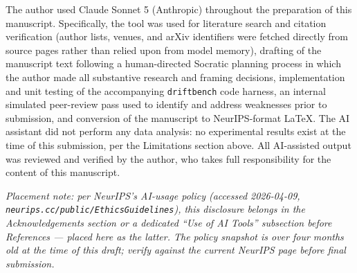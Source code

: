 \documentclass{article}
\begin{document}
The author used Claude Sonnet 5 (Anthropic) throughout the preparation of this manuscript. Specifically, the tool was used for literature search and citation verification (author lists, venues, and arXiv identifiers were fetched directly from source pages rather than relied upon from model memory), drafting of the manuscript text following a human-directed Socratic planning process in which the author made all substantive research and framing decisions, implementation and unit testing of the accompanying \texttt{driftbench} code harness, an internal simulated peer-review pass used to identify and address weaknesses prior to submission, and conversion of the manuscript to NeurIPS-format \LaTeX. The AI assistant did not perform any data analysis: no experimental results exist at the time of this submission, per the Limitations section above. All AI-assisted output was reviewed and verified by the author, who takes full responsibility for the content of this manuscript.

\emph{Placement note: per NeurIPS's AI-usage policy (accessed 2026-04-09, \texttt{neurips.cc/public/EthicsGuidelines}), this disclosure belongs in the Acknowledgements section or a dedicated ``Use of AI Tools'' subsection before References --- placed here as the latter. The policy snapshot is over four months old at the time of this draft; verify against the current NeurIPS page before final submission.}



\end{document}
